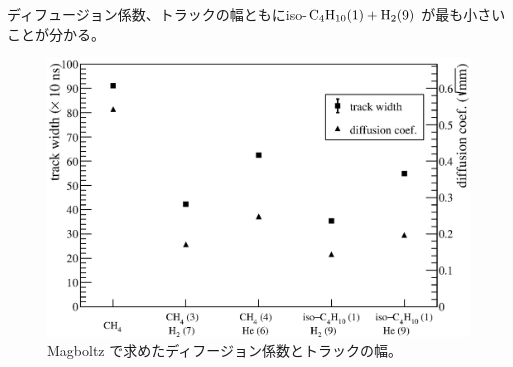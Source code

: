 \documentclass[../master]{subfiles}
\begin{document}
ディフュージョン係数、トラックの幅ともにiso-$\rm C_{4}H_{10} (1) + H_{2} (9)$ が最も小さいことが分かる。
\begin{figure}
  \centering
  \includegraphics[clip, width=0.9\columnwidth]{diffusion_compare.eps}
  \caption{Magboltz で求めたディフージョン係数とトラックの幅。}
  \label{fig::diffusion_compare}
\end{figure}
\end{document}
